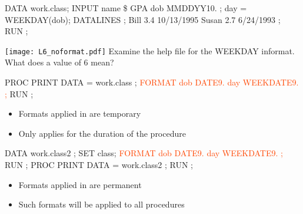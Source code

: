 \begin{frame}[fragile]
\footnotesize
\begin{code}{.0}
DATA work.class;
  INPUT name \$ GPA dob MMDDYY10. ;
  day = WEEKDAY(dob);
  DATALINES ;
  Bill  3.4  10/13/1995
  Susan 2.7  6/24/1993
  ;
RUN ;
\end{code}
\vskip10pt
\texttt{[image: L6\_noformat.pdf]}
\emp
{} \hspace{0.1in} \emp
{}
\oyo Examine the help file for the WEEKDAY informat.  What does a value of 6 mean?
\emp
\end{frame}

\begin{frame}[fragile]
\hspace*{-0.3in}
\footnotesize
\begin{code}{.0}
PROC PRINT DATA = work.class ;
   \textcolor{OrangeRed}{FORMAT dob DATE9.}
          \textcolor{OrangeRed}{day WEEKDATE9. ;}
RUN ;



\end{code}
\begin{itemize}
\item Formats applied in  are temporary
\item Only applies for the duration of the procedure
\end{itemize}
\emp
{} \hspace{1in} \emp
{}
\footnotesize
\begin{code}{.0}
DATA work.class2 ;
   SET class;
   \textcolor{OrangeRed}{FORMAT dob DATE9.}
          \textcolor{OrangeRed}{day WEEKDATE9. ;}
RUN ;
PROC PRINT DATA = work.class2 ;
RUN ;
\end{code}
\begin{itemize}
\item Formats applied in  are permanent
\item Such formats will be applied to all procedures
\end{itemize}
\emp
\end{frame}

